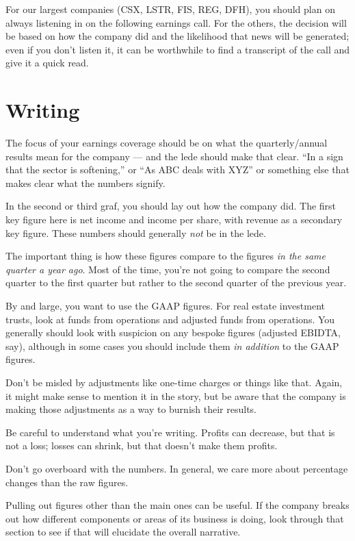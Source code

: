 \documentclass[
  12pt,
  american,
  letterpaperpaper,
  extrafontsizes,onecolumn,openright
  ]{memoir}
\begin{document}
For our largest companies (CSX, LSTR, FIS, REG, DFH), you should plan on always listening in on the following earnings call. For the others, the decision will be based on how the company did and the likelihood that news will be generated; even if you don't listen it, it can be worthwhile to find a transcript of the call and give it a quick read.

\hypertarget{writing}{%
\section*{Writing}\label{writing}}

The focus of your earnings coverage should be on what the quarterly/annual results mean for the company --- and the lede should make that clear. \enquote{In a sign that the sector is softening,} or \enquote{As ABC deals with XYZ} or something else that makes clear what the numbers signify.

In the second or third graf, you should lay out how the company did. The first key figure here is net income and income per share, with revenue as a secondary key figure. These numbers should generally \emph{not} be in the lede.

The important thing is how these figures compare to the figures \emph{in the same quarter a year ago}. Most of the time, you're not going to compare the second quarter to the first quarter but rather to the second quarter of the previous year.

By and large, you want to use the GAAP figures. For real estate investment trusts, look at funds from operations and adjusted funds from operations. You generally should look with suspicion on any bespoke figures (adjusted EBIDTA, say), although in some cases you should include them \emph{in addition} to the GAAP figures.

Don't be misled by adjustments like one-time charges or things like that. Again, it might make sense to mention it in the story, but be aware that the company is making those adjustments as a way to burnish their results.

Be careful to understand what you're writing. Profits can decrease, but that is not a loss; losses can shrink, but that doesn't make them profits.

Don't go overboard with the numbers. In general, we care more about percentage changes than the raw figures.

Pulling out figures other than the main ones can be useful. If the company breaks out how different components or areas of its business is doing, look through that section to see if that will elucidate the overall narrative.
\end{document}

